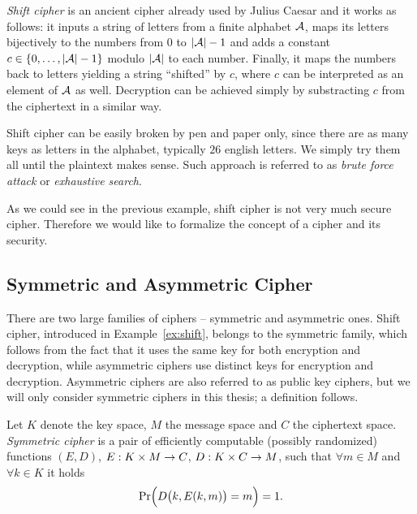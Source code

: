 \begin{example}
\label{ex:shift}
	{\em Shift cipher} is an ancient cipher already used by Julius Caesar and it works as follows: it inputs a string of letters from a finite alphabet $\cal A$, maps its letters bijectively to the numbers from $0$ to $|{\cal A}|-1$ and adds a constant $c\in\{0 , \ldots , |{\cal A}|-1\}$ modulo $|\cal A|$ to each number. Finally, it maps the numbers back to letters yielding a string ``shifted'' by $c$, where $c$ can be interpreted as an element of $\cal A$ as well. Decryption can be achieved simply by substracting $c$ from the ciphertext in a similar way.
	
	Shift cipher can be easily broken by pen and paper only, since there are as many keys as letters in the alphabet, typically $26$ english letters. We simply try them all until the plaintext makes sense. Such approach is referred to as {\em brute force attack} or {\em exhaustive search}.
\end{example}

As we could see in the previous example, shift cipher is not very much secure cipher. Therefore we would like to formalize the concept of a cipher and its security.



\subsection{Symmetric and Asymmetric Cipher}

There are two large families of ciphers -- symmetric and asymmetric ones. Shift cipher, introduced in Example~\ref{ex:shift}, belongs to the symmetric family, which follows from the fact that it uses the same key for both encryption and decryption, while asymmetric ciphers use distinct keys for encryption and decryption. Asymmetric ciphers are also referred to as public key ciphers, but we will only consider symmetric ciphers in this thesis; a definition follows.

\begin{defn}
\label{def:symcipher}
	Let $K$ denote the key space, $M$ the message space and $C$ the ciphertext space. {\em Symmetric cipher} is a pair of efficiently computable (possibly randomized) functions $(E,D)$, $E:K\times M\rightarrow C$, $D:K\times C\rightarrow M$, such that $\forall m\in M$ and $\forall k\in K$ it holds   %
	\begin{equation}
	\label{eq:correct}
		\Pr\Bigl(D\bigl(k,E(k,m)\bigr)=m\Bigr) = 1 .
	\end{equation}
\end{defn}

